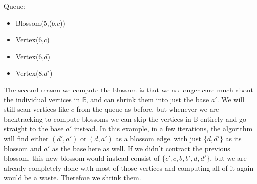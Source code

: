 \begin{minipage}{.7\linewidth}
\end{minipage}\hfill%
\begin{minipage}{.26\linewidth}
    \vspace{2cm}
    Queue:
    \begin{itemize}
        \item \st{Blossom(5,($b$,$c$))}
        \item Vertex(6,$c$)
        \item Vertex(6,$d$)
        \item Vertex(8,$d'$)
    \end{itemize}
\end{minipage}

The second reason we compute the blossom is that we no longer care much about the individual vertices in $\mathbb{B}$, and can shrink them into just the base $a'$. We will still scan vertices like $c$ from the queue as before, but whenever we are backtracking to compute blossoms we can skip the vertices in $\mathbb{B}$ entirely and go straight to the base $a'$ instead. In this example, in a few iterations, the algorithm will find either $(d',a')$ or $(d,a')$ as a blossom edge, with just $\{d,d'\}$ as its blossom and $a'$ as the base here as well. If we didn't contract the previous blossom, this new blossom would instead consist of $\{c',c,b,b',d,d'\}$, but we are already completely done with most of those vertices and computing all of it again would be a waste. Therefore we shrink them. 

